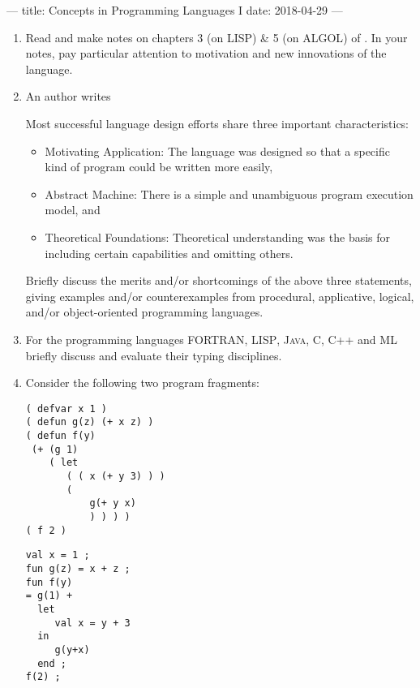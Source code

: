 ---
title: Concepts in Programming Languages I
date: 2018-04-29
---



\begin{enumerate}
  \item Read and make notes on chapters 3 (on \textsc{LISP}) \& 5 (on
    \textsc{ALGOL}) of \citet{mitchell2003concepts}. In your notes, pay
    particular attention to motivation and new innovations of the language.

  \item An author writes

    \begin{displayquote}
      Most successful language design efforts share three important
      characteristics:

      \begin{itemize}
        \item Motivating Application: The language was designed so that a
          specific kind of program could be written more easily,

        \item Abstract Machine: There is a simple and unambiguous program
          execution model, and

        \item Theoretical Foundations: Theoretical understanding was the basis
          for including certain capabilities and omitting others.
      \end{itemize}
    \end{displayquote}

    Briefly discuss the merits and/or shortcomings of the above three
    statements, giving examples and/or counterexamples from procedural,
    applicative, logical, and/or object-oriented programming languages.

  \item For the programming languages \textsc{FORTRAN}, \textsc{LISP},
    \textsc{Java}, \textsc{C}, \textsc{C++} and \textsc{ML} briefly discuss and
    evaluate their typing disciplines.

  \item Consider the following two program fragments:
    \begin{verbatim}
( defvar x 1 )
( defun g(z) (+ x z) )
( defun f(y)
 (+ (g 1)
    ( let
       ( ( x (+ y 3) ) )
       (
           g(+ y x)
           ) ) ) )
( f 2 )
    \end{verbatim}

    \begin{verbatim}
val x = 1 ;
fun g(z) = x + z ;
fun f(y)
= g(1) +
  let
     val x = y + 3
  in
     g(y+x)
  end ;
f(2) ;
    \end{verbatim}


\end{enumerate}
